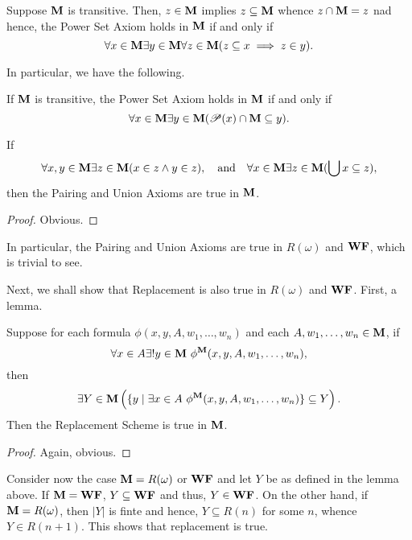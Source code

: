 Suppose $\mathbf{M}$ is transitive. Then, $z\in\mathbf{M}$ implies $z\subseteq\mathbf{M}$ whence $z\cap\mathbf{M} = z$ nad hence, the Power Set Axiom holds in $\mathbf{M}$ if and only if 
\begin{equation*}
    \forall x\in\mathbf{M}\exists y\in\mathbf{M}\forall z\in\mathbf{M}(z\subseteq x\implies z\in y).
\end{equation*}

In particular, we have the following. 
\begin{lemma}
    If $\mathbf{M}$ is transitive, the Power Set Axiom holds in $\mathbf{M}$ if and only if 
    \begin{equation*}
        \forall x\in\mathbf{M}\exists y\in\mathbf{M}(\mathscr P(x)\cap\mathbf{M}\subseteq y).
    \end{equation*}
\end{lemma}

\begin{lemma}
    If 
    \begin{equation*}
        \forall x,y\in\mathbf{M}\exists z\in\mathbf{M}(x\in z\wedge y\in z),\quad\text{and}\quad\forall x\in\mathbf{M}\exists z\in\mathbf{M}(\bigcup x\subseteq z),
    \end{equation*}
    then the Pairing and Union Axioms are true in $\mathbf{M}$.
\end{lemma}
\begin{proof}
    Obvious.
\end{proof}

In particular, the Pairing and Union Axioms are true in $R(\omega)$ and $\mathbf{WF}$, which is trivial to see. 

Next, we shall show that Replacement is also true in $R(\omega)$ and $\mathbf{WF}$. First, a lemma.
\begin{lemma}
    Suppose for each formula $\phi(x,y,A,w_1,\dots,w_n)$ and each $A,w_1,\dots,w_n\in\mathbf{M}$, if 
    \begin{equation*}
        \forall x\in A\exists! y\in\mathbf{M}~\phi^{\mathbf{M}}(x,y,A,w_1,\dots,w_n),
    \end{equation*}
    then 
    \begin{equation*}
        \exists Y\in\mathbf{M}\left(\{y\mid\exists x\in A~\phi^{\mathbf{M}}(x,y, A, w_1,\dots,w_n)\}\subseteq Y\right).
    \end{equation*}
    Then the Replacement Scheme is true in $\mathbf{M}$.
\end{lemma}
\begin{proof}
    Again, obvious.
\end{proof}

Consider now the case $\mathbf{M} = R(\omega)$ or $\mathbf{WF}$ and let $Y$ be as defined in the lemma above. If $\mathbf{M} = \mathbf{WF}$, $Y\subseteq\mathbf{WF}$ and thus, $Y\in\mathbf{WF}$. On the other hand, if $\mathbf{M} = R(\omega)$, then $|Y|$ is finte and hence, $Y\subseteq R(n)$ for some $n$, whence $Y\in R(n + 1)$. This shows that replacement is true. 

